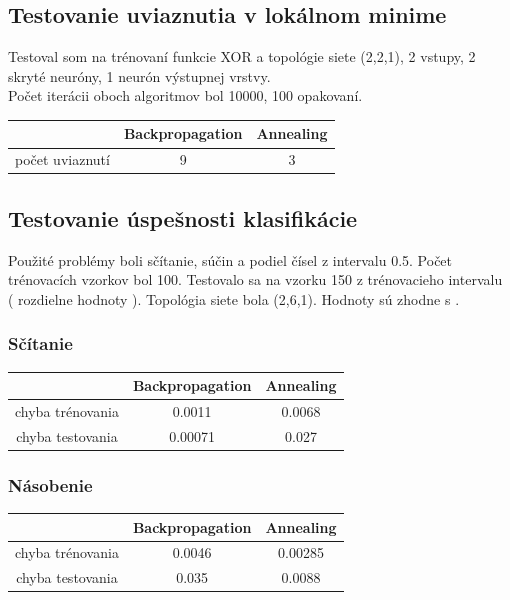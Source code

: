 \documentclass[11pt,a4paper]{article}
\begin{document}
\subsection{Testovanie uviaznutia v lokálnom minime}
Testoval som na trénovaní funkcie XOR a topológie siete (2,2,1), 2 vstupy, 2 skryté neuróny, 1 neurón výstupnej vrstvy.\\
Počet iterácii oboch algoritmov bol 10000, 100 opakovaní.
\begin{center}
\begin{tabular}{|c|c|c|}
\hline 
 & Backpropagation & Annealing \\ 
\hline 
počet uviaznutí & 9 & 3 \\ 
\hline 
\end{tabular} 
\end{center}
\subsection{Testovanie úspešnosti klasifikácie}
Použité problémy boli sčítanie, súčin a podiel čísel z intervalu 0.5. Počet trénovacích vzorkov bol 100. Testovalo sa na vzorku 150 z trénovacieho intervalu ( rozdielne hodnoty ).  Topológia siete bola (2,6,1). Hodnoty sú zhodne s \cite{sabp}.
\subsubsection{Sčítanie}
\begin{center}
\begin{tabular}{|c|c|c|}
\hline 
 & Backpropagation & Annealing \\ 
\hline 
chyba trénovania & 0.0011 & 0.0068 \\ 
\hline 
chyba testovania & 0.00071 & 0.027 \\ 
\hline 
\end{tabular} 
\end{center}

\subsubsection{Násobenie}
\begin{center}
\begin{tabular}{|c|c|c|}
\hline 
 & Backpropagation & Annealing \\ 
\hline 
chyba trénovania & 0.0046 & 0.00285 \\ 
\hline 
chyba testovania & 0.035 & 0.0088 \\ 
\hline 
\end{tabular}
\end{center}
\end{document}
